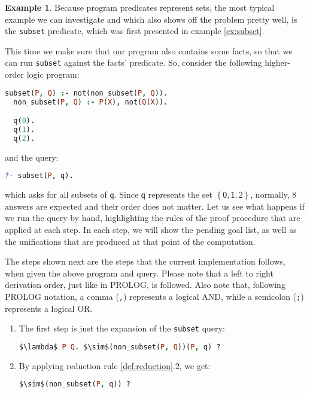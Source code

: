 \documentclass[inscr,ack,preface]{dithesis}
\theoremstyle{definition}
\newtheorem{example}{Example}[chapter]
\newcommand{\msf}[1]{$\mathsf{#1}$}
\begin{document}
\begin{example}
\label{ex:subsettrace}
Because program predicates represent sets, the most typical example we can investigate and which also shows off the problem pretty well, is the \texttt{subset} predicate, which was first presented in example \ref{ex:subset}.

This time we make sure that our program also contains some facts, so that we can run \texttt{subset} against the facts' predicate. So, consider the following higher-order logic program:
\begin{lstlisting}[language=Prolog,frame=single]
  subset(P, Q) :- not(non_subset(P, Q)).
  non_subset(P, Q) :- P(X), not(Q(X)).

  q(0).
  q(1).
  q(2).
\end{lstlisting}
and the query:
\begin{lstlisting}[language=Prolog,frame=single]
  ?- subset(P, q).
\end{lstlisting}
which asks for all subsets of \msf{q}. Since \msf{q} represents the set \msf{\left\{ 0, 1, 2 \right\}}, normally, 8 answers are expected and their order does not matter. Let us see what happens if we run the query by hand, highlighting the rules of the proof procedure that are applied at each step. In each step, we will show the pending goal list, as well as the unifications that are produced at that point of the computation.

The steps shown next are the steps that the current implementation follows, when given the above program and query. Please note that a left to right derivation order, just like in PROLOG, is followed. Also note that, following PROLOG notation, a comma (\texttt{,}) represents a logical AND, while a semicolon (\texttt{;}) represents a logical OR.

\begin{enumerate}
\item The first step is just the expansion of the \texttt{subset} query:
\begin{lstlisting}[language=Prolog,%
  frame=single,breaklines=false,mathescape=true]
  $\lambda$ P Q. $\sim$(non_subset(P, Q))(P, q) ?
\end{lstlisting}

\item By applying reduction rule \ref{def:reduction}.2, we get:
\begin{lstlisting}[language=Prolog,%
  frame=single,breaklines=false,mathescape=true]
  $\sim$(non_subset(P, q)) ?
\end{lstlisting}


\end{enumerate}
\end{example}
\end{document}
